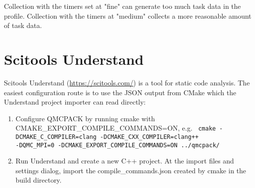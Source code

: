 Collection with the timers set at "fine" can generate too much task data in the profile.
Collection with the timers at "medium" collects a more reasonable amount of task data.

\section{Scitools Understand}

Scitools Understand (\url{https://scitools.com/}) is a tool for static
code analysis. The easiest configuration route is to use the JSON output
from CMake which the Understand project importer can read directly:
\begin{enumerate}
\item Configure QMCPACK by running cmake with
  CMAKE\_EXPORT\_COMPILE\_COMMANDS=ON, e.g.
  \texttt{ cmake -DCMAKE\_C\_COMPILER=clang -DCMAKE\_CXX\_COMPILER=clang++ \\
    -DQMC\_MPI=0 -DCMAKE\_EXPORT\_COMPILE\_COMMANDS=ON ../qmcpack/ }
\item Run Understand and create a new C++ project. At the import files
  and settings dialog, import the compile\_commands.json created by
  cmake in the build directory.  
\end{enumerate}

